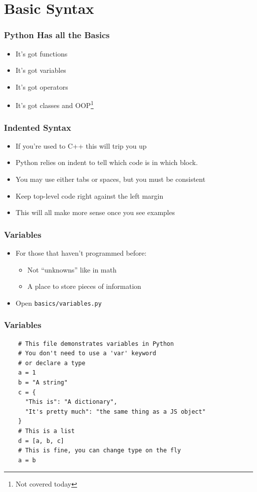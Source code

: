\documentclass[aspectratio=169]{beamer}
\begin{document}
\section{Basic Syntax}
\begin{frame}
  \frametitle{Python Has all the Basics}
  \begin{itemize}
    \item It's got functions
    \pause
    \item It's got variables
    \pause
    \item It's got operators
    \pause
    \item It's got classes and OOP\footnote{Not covered today}
  \end{itemize}
\end{frame}
\begin{frame}
  \frametitle{Indented Syntax}
  \begin{itemize}
    \item If you're used to C++ this will trip you up
    \item Python relies on indent to tell which code is in
          which block.
    \item You may use either tabs or spaces, but you must be consistent
    \item Keep top-level code right against the left margin
    \item This will all make more sense once you see examples
  \end{itemize}
\end{frame}
\begin{frame}
  \frametitle{Variables}
  \begin{itemize}
    \item For those that haven't programmed before:
      \begin{itemize}
        \item Not ``unknowns'' like in math
        \item A place to store pieces of information
      \end{itemize}
    \item Open \texttt{basics/variables.py}
  \end{itemize}
  \pause

\end{frame}
\begin{frame}[fragile]
  \frametitle{Variables}
  \begin{verbatim}
    # This file demonstrates variables in Python
    # You don't need to use a 'var' keyword
    # or declare a type
    a = 1
    b = "A string"
    c = {
      "This is": "A dictionary",
      "It's pretty much": "the same thing as a JS object"
    }
    # This is a list
    d = [a, b, c]
    # This is fine, you can change type on the fly
    a = b
    \end{verbatim}
\end{frame}
\end{document}

